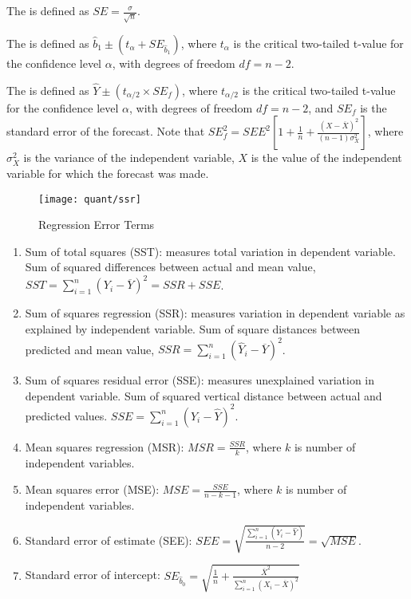 \begin{definition}The  is defined as $SE = \frac{\sigma}{\sqrt{n}}$.
\end{definition}

\begin{definition} The  is defined as $\hat{b}_1 \pm (t_{\alpha} + SE_{\hat{b}_1})$, where $t_{\alpha}$ is the critical two-tailed t-value for the confidence level $\alpha$, with degrees of freedom $df = n-2$.
\end{definition}

\begin{definition} The  is defined as $\hat{Y} \pm (t_{\alpha/2} \times SE_{f})$, where $t_{\alpha/2}$ is the critical two-tailed t-value for the confidence level $\alpha$, with degrees of freedom $df = n-2$, and $SE_f$ is the standard error of the forecast. 
 Note that $SE_f^2 = SEE^2 \left[1 + \frac{1}{n} + \frac{(X - \overline{X})^2}{(n-1)\sigma^2_X} \right]$, where $\sigma^2_X$ is the variance of the independent variable, $X$ is the value of the independent variable for which the forecast was made.
\end{definition}

\begin{figure}[H]
\centering
\texttt{[image: quant/ssr]}
\caption{Regression Error Terms}
\end{figure}
 
\begin{definition} 
\begin{enumerate}[label=\roman*.]
\setlength{\itemsep}{0pt}
\item Sum of total squares (SST): measures total variation in dependent variable. Sum of squared differences between actual and mean value, $SST = \sum\limits_{i=1}^n (Y_i - \overline{Y})^2 = SSR + SSE$.
\item Sum of squares regression (SSR): measures variation in dependent variable as explained by independent variable. Sum of square distances between predicted and mean value, $SSR = \sum\limits_{i=1}^n (\hat{Y}_i - \overline{Y})^2$.
\item Sum of squares residual error (SSE): measures unexplained variation in dependent variable. Sum of squared vertical distance between actual and predicted values. $SSE = \sum\limits_{i=1}^n (Y_i - \hat{Y})^2$.
\item Mean squares regression (MSR): $MSR = \frac{SSR}{k}$, where $k$ is number of independent variables.
\item Mean squares error (MSE): $MSE = \frac{SSE}{n-k-1}$, where $k$ is number of independent variables.
\item Standard error of estimate (SEE): $SEE = \sqrt{\frac{\sum\limits_{i=1}^n (Y_i - \hat{Y})}{n-2}} = \sqrt{MSE}$.
\item Standard error of intercept: $SE_{\hat{b}_0} = \sqrt{\frac{1}{n} + \frac{\overline{X}^2}{\sum\limits_{i=1}^n(X_i - \overline{X})^2}}$
\end{enumerate}
\end{definition}

